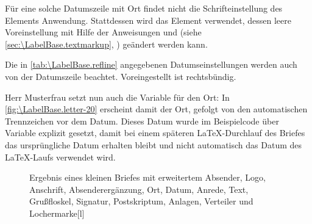 \BeginIndexGroup
{}%
Für eine solche Datumszeile mit Ort findet
nicht die Schrifteinstellung des Elements
 Anwendung. Stattdessen wird das
Element 
verwendet, dessen leere Voreinstellung mit Hilfe der Anweisungen
 und
 (siehe
\autoref{sec:\LabelBase.textmarkup}, )
geändert werden kann.%
\EndIndexGroup

\iffalse%
Seit Version~3.09\ChangedAt{v3.09}{\Class{scrlttr2}} werden Ort und Datum
nicht mehr zwingend rechtsbündig ausgegeben. Stattdessen findet auch im Falle
der Datumszeile die Datumseinstellung von Option
\DescRef{\LabelBase.option.refline}\IndexOption{refline}%
\important{\DescRef{\LabelBase.option.refline}}, wie sie in
\autoref{tab:\LabelBase.refline} angegeben ist, Anwendung.%
\else%
Die in \autoref{tab:\LabelBase.refline} angegebenen Datumseinstellungen
werden auch von der Datumszeile
beachtet. Voreingestellt ist rechtsbündig.%
\fi

\begin{Example}
  Herr Musterfrau setzt nun auch die Variable für den Ort:
  \iffalse%
  Damit erscheint vor dem Datum, wie in \autoref{fig:\LabelBase.letter-20} zu
  sehen, %
  \else%
  In \autoref{fig:\LabelBase.letter-20} erscheint damit %
  \fi %
  der Ort, gefolgt von den automatischen Trennzeichen vor dem Datum. Dieses
  Datum wurde im Beispielcode über Variable 
  explizit gesetzt, damit bei einem späteren \LaTeX-Durchlauf des Briefes das
  ursprüngliche Datum erhalten bleibt und nicht automatisch das Datum des
  \LaTeX-Laufs verwendet wird.
  \begin{figure}
    \setcapindent{0pt}%
    \begin{captionbeside}{Ergebnis eines kleinen Briefes mit erweitertem Absender,
        Logo, Anschrift, Absenderergänzung, Ort, Datum, Anrede,
        Text, Grußfloskel, Signatur, Postskriptum, Anlagen, Verteiler und
        Lochermarke}[l]
    \end{captionbeside}
    \label{fig:\LabelBase.letter-20}
  \end{figure}
\end{Example}%
\EndIndexGroup
\EndIndexGroup
\EndIndexGroup
\ExampleEndFix%


